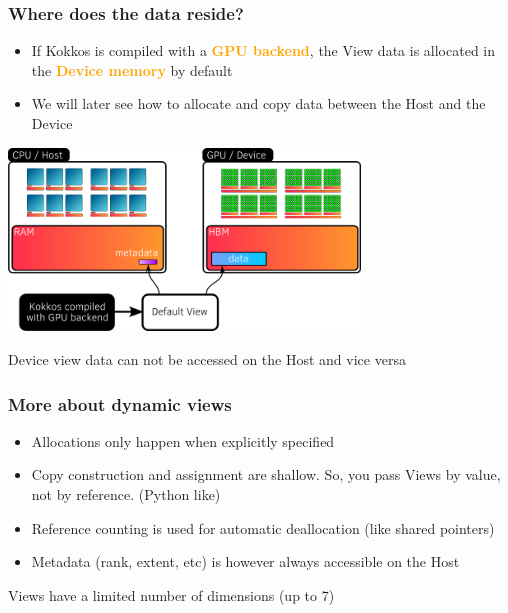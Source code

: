 \documentclass[aspectratio=169]{beamer}
\newcommand{\highlight}[1]{\textcolor{orange}{\textbf{#1}}}
\begin{document}

\begin{frame}[fragile]
    \frametitle{Where does the data reside?}

    \begin{itemize}
        \item If Kokkos is compiled with a \highlight{GPU backend}, the View data is allocated in the \highlight{Device memory} by default
        \item We will later see how to allocate and copy data between the Host and the Device
    \end{itemize}

\centering
\includegraphics[width=0.7\textwidth]{../../images/device_view_memory.png}

\begin{alertblock}{}
    Device view data can not be accessed on the Host and vice versa
\end{alertblock} 

\end{frame} 


\begin{frame}[fragile]
    \frametitle{More about dynamic views}

\begin{itemize}
    \item Allocations only happen when explicitly specified
    \item Copy construction and assignment are shallow. So, you pass Views by value, not by reference. (Python like)
    \item Reference counting is used for automatic deallocation (like shared pointers)
    \item Metadata (rank, extent, etc) is however always accessible on the Host
\end{itemize}

\begin{alertblock}{}
    Views have a limited number of dimensions (up to 7)
\end{alertblock}

\end{frame} 
\end{document}
